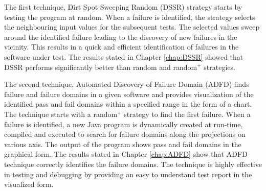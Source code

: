 






The first technique, Dirt Spot Sweeping Random (DSSR) strategy starts by testing the program at random. When a failure is identified, the strategy selects the neighbouring input values for the subsequent tests. The selected values sweep around the identified failure leading to the discovery of new failures in the vicinity. This results in a quick and efficient identification of failures in the software under test. The results stated in Chapter \ref{chap:DSSR} showed that DSSR performs significantly better than random and random$^+$ strategies.

The second technique, Automated Discovery of Failure Domain (ADFD) finds failure and failure domains in a given software and provides visualization of the identified pass and fail domains within a specified range in the form of a chart. The technique starts with a random$^+$ strategy to find the first failure. When a failure is identified, a new Java program is dynamically created at run-time, compiled and executed to search for failure domains along the projections on various axis. The output of the program shows pass and fail domains in the graphical form. The results stated in Chapter \ref{chap:ADFD} show that ADFD technique correctly identifies the failure domains. The technique is highly effective in testing and debugging by providing an easy to understand test report in the visualized form. 

